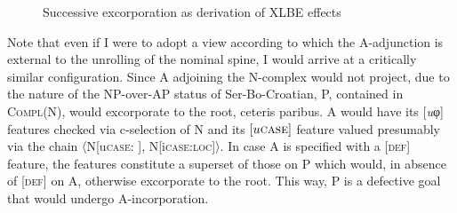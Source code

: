 \documentclass[output=paper]{langsci/langscibook}
\begin{document}
\begin{figure}
    \caption{Successive excorporation as derivation of XLBE effects\label{fig:18.3}}
\end{figure}

Note that even if I were to adopt a view according to which the
A-ad\-jun\-ction is external to the unrolling of the nominal spine, I would
arrive at a critically similar configuration. Since A adjoining the
N-complex would not project, due to the nature of the NP-over-AP status of
Ser-Bo-Croatian,  P, contained in
\textsc{Compl}(N), would excorporate to the root, ceteris paribus.
A would have its [\emph{u}φ] features checked via c-selection of N and
its $[u\textsc{case}]$ feature valued presumably via the chain
〈N[u\textsc{case: }], N[i\textsc{case:loc}]〉. In case
A is specified with a \textsc{[def]} feature, the features constitute
a superset of those on P which would, in absence of \textsc{[def]} on
A, otherwise excorporate to the root. This way, P is a defective goal
that would undergo A-incorporation.
\end{document}
